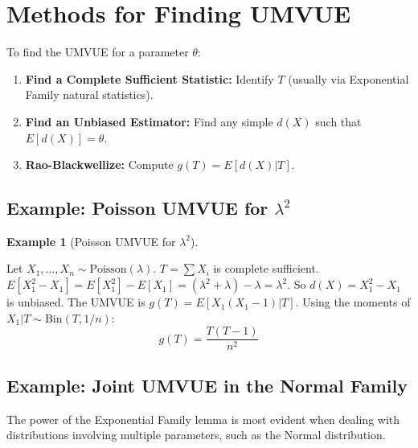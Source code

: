 \documentclass[
  letterpaper,
  DIV=11,
  numbers=noendperiod]{scrreprt}
\providecommand{\tightlist}{%
  \setlength{\itemsep}{0pt}\setlength{\parskip}{0pt}}
\renewcommand{\[}{\begin{equation}}
\renewcommand{\]}{\end{equation}}
\theoremstyle{definition}
\theoremstyle{plain}
\theoremstyle{plain}
\theoremstyle{plain}
\theoremstyle{definition}
\newtheorem{example}{Example}[chapter]
\theoremstyle{plain}
\theoremstyle{remark}
\begin{document}
\section{Methods for Finding UMVUE}\label{methods-for-finding-umvue}

To find the UMVUE for a parameter \(\theta\):

\begin{enumerate}
\def\labelenumi{\arabic{enumi}.}
\tightlist
\item
  \textbf{Find a Complete Sufficient Statistic:} Identify \(T\) (usually
  via Exponential Family natural statistics).
\item
  \textbf{Find an Unbiased Estimator:} Find any simple \(d(X)\) such
  that \(E[d(X)] = \theta\).
\item
  \textbf{Rao-Blackwellize:} Compute \(g(T) = E[d(X)|T]\).
\end{enumerate}

\subsection{\texorpdfstring{Example: Poisson UMVUE for
\(\lambda^2\)}{Example: Poisson UMVUE for \textbackslash lambda\^{}2}}\label{example-poisson-umvue-for-lambda2}

\begin{example}[Poisson UMVUE for
\(\lambda^2\)]\protect\hypertarget{exm-poisson-umvue}{}\label{exm-poisson-umvue}

Let \(X_1, \dots, X_n \sim \text{Poisson}(\lambda)\). \(T = \sum X_i\)
is complete sufficient.
\(E[X_1^2 - X_1] = E[X_1^2] - E[X_1] = (\lambda^2 + \lambda) - \lambda = \lambda^2\).
So \(d(X) = X_1^2 - X_1\) is unbiased. The UMVUE is
\(g(T) = E[X_1(X_1-1) | T]\). Using the moments of
\(X_1|T \sim \text{Bin}(T, 1/n)\): \[g(T) = \frac{T(T-1)}{n^2}\]

\end{example}

\subsection{Example: Joint UMVUE in the Normal
Family}\label{example-joint-umvue-in-the-normal-family}

The power of the Exponential Family lemma is most evident when dealing
with distributions involving multiple parameters, such as the Normal
distribution.
\end{document}
